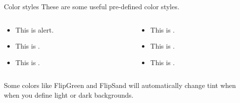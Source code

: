\begin{frame}[c]{Color styles}
	These are some useful pre-defined color styles.
	
		\begin{columns}[t]
		\begin{column}[T]{5cm}
			\begin{itemize}
			\item This is \alert{alert}.
			\item This is .
			\item This is .
			\end{itemize}
		\end{column}

		\begin{column}[T]{5cm}
			\begin{itemize}
			\item This is .
			\item This is .
			\item This is .
			\end{itemize}
		\end{column}
		\end{columns}
		\vspace{1em}
		Some colors like \textcolor{FlipGreen}{FlipGreen} and \textcolor{FlipSand}{FlipSand} will automatically change tint when when you define light or dark backgrounds. 
		
		\vspace{1em}
\end{frame}



